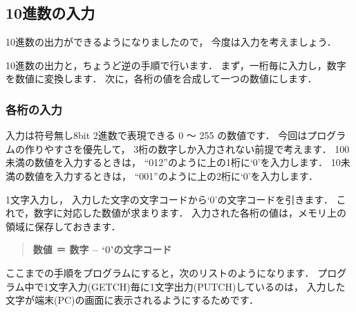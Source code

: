 \subsection{10進数の入力}

10進数の出力ができるようになりましたので，
今度は入力を考えましょう．

10進数の出力と，ちょうど逆の手順で行います．
まず，一桁毎に入力し，数字を数値に変換します．
次に，各桁の値を合成して一つの数値にします．

\subsubsection{各桁の入力}

入力は符号無し8bit 2進数で表現できる 0 〜 255 の数値です．
今回はプログラムの作りやすさを優先して，
3桁の数字しか入力されない前提で考えます．
100未満の数値を入力するときは，
``012''のように上の1桁に`0'を入力します．
10未満の数値を入力するときは，
``001''のように上の2桁に`0'を入力します．

1文字入力し，
入力した文字の文字コードから`0'の文字コードを引きます．
これで，数字に対応した数値が求まります．
入力された各桁の値は，メモリ上の領域に保存しておきます．

\begin{quote}
{\bf 数値 ＝ 数字 -- `0'の文字コード}
\end{quote}

ここまでの手順をプログラムにすると，次のリストのようになります．
プログラム中で1文字入力(GETCH)毎に1文字出力(PUTCH)しているのは，
入力した文字が端末(PC)の画面に表示されるようにするためです．

